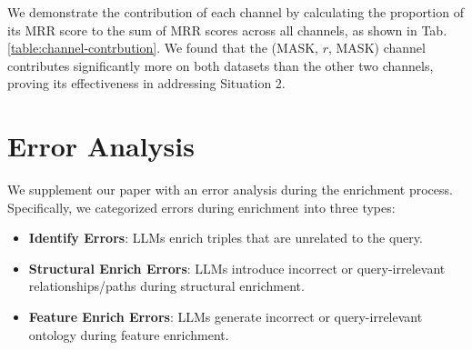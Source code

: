 \documentclass[11pt]{article}
\begin{document}
\begin{table}[]
\centering
{}
\caption{MRR scores comparision between vanilla pruning and our Three Channel Pruning.}
\label{table:three-channel-pruning}
\end{table}

We demonstrate the contribution of each channel by calculating the proportion of its MRR score to the sum of MRR scores across all channels, as shown in Tab. \ref{table:channel-contrbution}. We found that the (MASK, $r$, MASK) channel contributes significantly more on both datasets than the other two channels, proving its effectiveness in addressing Situation 2.

\begin{table}[]
\centering
{}
\caption{Contribution of each channel.}
\label{table:channel-contrbution}
\end{table}

\section{Error Analysis}

We supplement our paper with an error analysis during the enrichment process. Specifically, we categorized errors during enrichment into three types:

\begin{itemize}
    \item \textbf{Identify Errors}: LLMs enrich triples that are unrelated to the query.

    \item \textbf{Structural Enrich Errors}: LLMs introduce incorrect or query-irrelevant relationships/paths during structural enrichment.

    \item \textbf{Feature Enrich Errors}: LLMs generate incorrect or query-irrelevant ontology during feature enrichment.
\end{itemize}
\end{document}
